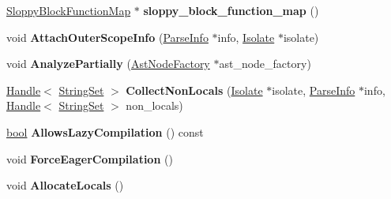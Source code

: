 \begin{DoxyCompactItemize}
\mbox{\hyperlink{classv8_1_1internal_1_1SloppyBlockFunctionMap}{Sloppy\+Block\+Function\+Map}} $\ast$ {\bfseries sloppy\+\_\+block\+\_\+function\+\_\+map} ()
\item 
\mbox{\label{classv8_1_1internal_1_1DeclarationScope_a13a38c0360828de7b6c6f22bfb8bd2bb}} 
void {\bfseries Attach\+Outer\+Scope\+Info} (\mbox{\hyperlink{classv8_1_1internal_1_1ParseInfo}{Parse\+Info}} $\ast$info, \mbox{\hyperlink{classv8_1_1internal_1_1Isolate}{Isolate}} $\ast$isolate)
\item 
\mbox{\label{classv8_1_1internal_1_1DeclarationScope_ac7eb65e6dce1066d664dfadd075fdf5e}} 
void {\bfseries Analyze\+Partially} (\mbox{\hyperlink{classv8_1_1internal_1_1AstNodeFactory}{Ast\+Node\+Factory}} $\ast$ast\+\_\+node\+\_\+factory)
\item 
\mbox{\label{classv8_1_1internal_1_1DeclarationScope_a1691f5cd447508479d16887350f0e4e8}} 
\mbox{\hyperlink{classv8_1_1internal_1_1Handle}{Handle}}$<$ \mbox{\hyperlink{classv8_1_1internal_1_1StringSet}{String\+Set}} $>$ {\bfseries Collect\+Non\+Locals} (\mbox{\hyperlink{classv8_1_1internal_1_1Isolate}{Isolate}} $\ast$isolate, \mbox{\hyperlink{classv8_1_1internal_1_1ParseInfo}{Parse\+Info}} $\ast$info, \mbox{\hyperlink{classv8_1_1internal_1_1Handle}{Handle}}$<$ \mbox{\hyperlink{classv8_1_1internal_1_1StringSet}{String\+Set}} $>$ non\+\_\+locals)
\item 
\mbox{\label{classv8_1_1internal_1_1DeclarationScope_a8bf6438af3804515bfd904abe62025c2}} 
\mbox{\hyperlink{classbool}{bool}} {\bfseries Allows\+Lazy\+Compilation} () const
\item 
\mbox{\label{classv8_1_1internal_1_1DeclarationScope_a42be34b07e434212db049bda71ac25fa}} 
void {\bfseries Force\+Eager\+Compilation} ()
\item 
\mbox{\label{classv8_1_1internal_1_1DeclarationScope_af02fbaddc85d4e57a5bcb1fa1ac4a8fe}} 
void {\bfseries Allocate\+Locals} ()
\item 
\mbox{\label{classv8_1_1internal_1_1DeclarationScope_a3275a5754106bf9c27c7c6656b5315ab}} 

\end{DoxyCompactItemize}
